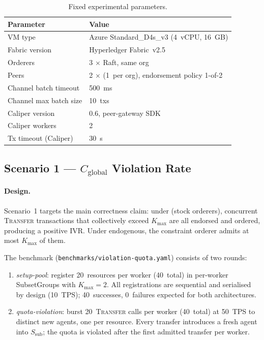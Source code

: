 \begin{table}[h]
\centering
\caption{Fixed experimental parameters.}
\label{tab:setup}
\begin{tabular}{ll}
\toprule
Parameter & Value \\
\midrule
VM type                     & Azure Standard\_D4s\_v3 (4~vCPU, 16~GB) \\
Fabric version              & Hyperledger Fabric~v2.5 \\
Orderers                    & 3 $\times$ Raft, same org \\
Peers                       & 2 $\times$ (1~per org), endorsement policy 1-of-2 \\
Channel batch timeout       & 500~ms \\
Channel max batch size      & 10~txs \\
Caliper version             & 0.6, peer-gateway SDK \\
Caliper workers             & 2 \\
Tx timeout (Caliper)        & 30~s \\
\bottomrule
\end{tabular}
\end{table}

\subsection{Scenario 1 — \texorpdfstring{$C_\text{global}$}{C\_global} Violation Rate}
\label{subsec:eval-sc1}

\paragraph{Design.}
Scenario~1 targets the main correctness claim: under  (stock orderers),
concurrent \textsc{Transfer} transactions that collectively exceed $K_\text{max}$
are all endorsed and ordered, producing a positive IVR.  Under 
endogenous, the constraint orderer admits at most $K_\text{max}$ of them.

The benchmark (\texttt{benchmarks/violation-quota.yaml}) consists of two rounds:
\begin{enumerate}
  \item \emph{setup-pool}: register 20~resources per worker (40~total) in
    per-worker SubsetGroups with $K_\text{max} = 2$.  All registrations are
    sequential and serialised by design (10~TPS); 40~successes, 0~failures
    expected for both architectures.
  \item \emph{quota-violation}: burst 20~\textsc{Transfer} calls per worker
    (40~total) at 50~TPS to distinct new agents, one per resource.  Every
    transfer introduces a fresh agent into $S_\text{sub}$; the quota is
    violated after the first admitted transfer per worker.
\end{enumerate}

